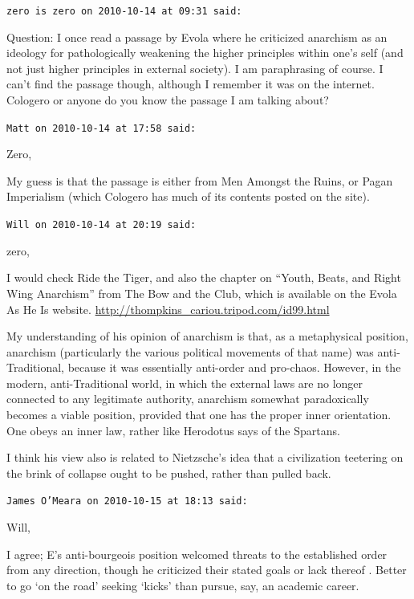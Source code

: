 \begin{footnotesize}
\begin{sffamily}
\hfill

\texttt{zero is zero on 2010-10-14 at 09:31 said:}

Question: I once read a passage by Evola where he criticized anarchism as an ideology for pathologically weakening the higher principles within one's self (and not just higher principles in external society). I am paraphrasing of course. I can't find the passage though, although I remember it was on the internet. Cologero or anyone do you know the passage I am talking about?

\hfill

\texttt{Matt on 2010-10-14 at 17:58 said:}

Zero,

My guess is that the passage is either from Men Amongst the Ruins, or Pagan Imperialism (which Cologero has much of its contents posted on the site).

\hfill

\texttt{Will on 2010-10-14 at 20:19 said:}

zero,

I would check Ride the Tiger, and also the chapter on ``Youth, Beats, and Right Wing Anarchism'' from The Bow and the Club, which is available on the Evola As He Is website.
\url{http://thompkins\_cariou.tripod.com/id99.html}


My understanding of his opinion of anarchism is that, as a metaphysical position, anarchism (particularly the various political movements of that name) was anti-Traditional, because it was essentially anti-order and pro-chaos. However, in the modern, anti-Traditional world, in which the external laws are no longer connected to any legitimate authority, anarchism somewhat paradoxically becomes a viable position, provided that one has the proper inner orientation. One obeys an inner law, rather like Herodotus says of the Spartans.

I think his view also is related to Nietzsche's idea that a civilization teetering on the brink of collapse ought to be pushed, rather than pulled back.

\hfill

\texttt{James O'Meara on 2010-10-15 at 18:13 said:}

Will,

I agree; E's anti-bourgeois position welcomed threats to the established order from any direction, though he criticized their stated goals or lack thereof . Better to go `on the road' seeking `kicks' than pursue, say, an academic career.


\end{sffamily}
\end{footnotesize}
